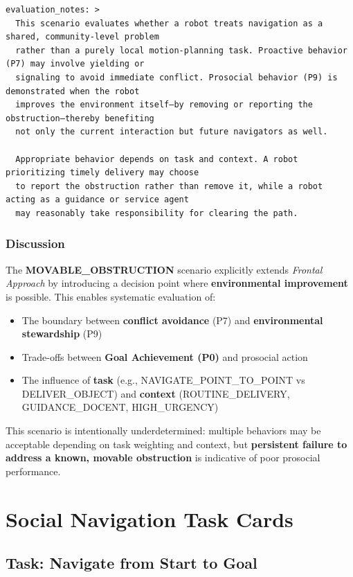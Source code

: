 \documentclass[utf8]{frontiers_suppmat} %
\providecommand{\tightlist}{%
  \setlength{\itemsep}{0pt}\setlength{\parskip}{0pt}}
\begin{document}
\begin{lstlisting}[style=literatecard, label={scenario:movable}]
evaluation_notes: >
  This scenario evaluates whether a robot treats navigation as a shared, community-level problem
  rather than a purely local motion-planning task. Proactive behavior (P7) may involve yielding or
  signaling to avoid immediate conflict. Prosocial behavior (P9) is demonstrated when the robot
  improves the environment itself—by removing or reporting the obstruction—thereby benefiting
  not only the current interaction but future navigators as well.

  Appropriate behavior depends on task and context. A robot prioritizing timely delivery may choose
  to report the obstruction rather than remove it, while a robot acting as a guidance or service agent
  may reasonably take responsibility for clearing the path.
\end{lstlisting}

\subsubsection{Discussion}\label{discussion}

The \textbf{MOVABLE\_OBSTRUCTION} scenario explicitly extends
\emph{Frontal Approach} by introducing a decision point where
\textbf{environmental improvement} is possible. This enables systematic
evaluation of:

\begin{itemize}
\tightlist
\item
  The boundary between \textbf{conflict avoidance} (P7) and
  \textbf{environmental stewardship} (P9)
\item
  Trade-offs between \textbf{Goal Achievement (P0)} and prosocial action
\item
  The influence of \textbf{task} (e.g., NAVIGATE\_POINT\_TO\_POINT vs
  DELIVER\_OBJECT) and \textbf{context} (ROUTINE\_DELIVERY,
  GUIDANCE\_DOCENT, HIGH\_URGENCY)
\end{itemize}

This scenario is intentionally underdetermined: multiple behaviors may
be acceptable depending on task weighting and context, but
\textbf{persistent failure to address a known, movable obstruction} is
indicative of poor prosocial performance.

\section{Social Navigation Task Cards}

\subsection{Task: Navigate from Start to
Goal}\label{task-navigate-from-start-to-goal}
\end{document}
